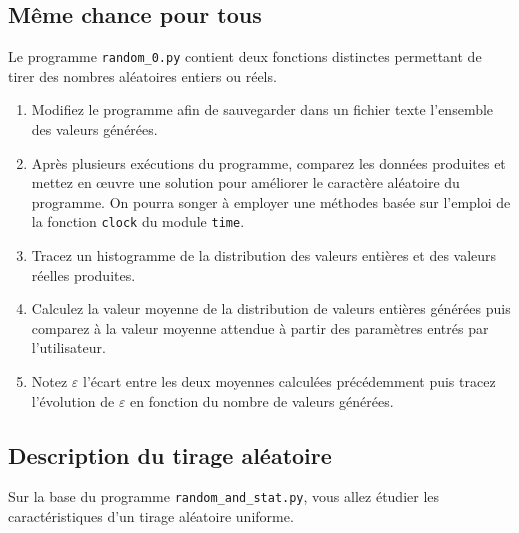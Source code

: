 \subsection{Même chance pour tous}

Le programme \texttt{random\_0.py}  contient deux fonctions distinctes
permettant de tirer des nombres aléatoires entiers ou réels.

\begin{enumerate}
\item Modifiez le programme afin  de sauvegarder dans un fichier texte
  l'ensemble des valeurs générées.

\item Après  plusieurs exécutions  du programme, comparez  les données
  produites  et mettez  en \oe{}uvre  une solution  pour améliorer  le
  caractère aléatoire du programme. On pourra songer à employer    une
  méthodes basée sur l'emploi  de la fonction \texttt{clock} du module
  \texttt{time}.

\item Tracez  un histogramme de la distribution des valeurs  entières et
  des valeurs réelles produites.

\item  Calculez  la  valeur  moyenne de  la  distribution  de  valeurs
  entières  générées puis  comparez  à la  valeur  moyenne attendue  à
  partir des paramètres entrés par l'utilisateur.

\item Notez  $\varepsilon$ l'écart  entre les deux  moyennes calculées
  précédemment puis tracez l'évolution de $\varepsilon$ en fonction du
  nombre de valeurs générées.

\end{enumerate}


\subsection{Description du tirage aléatoire}

Sur  la base  du programme  \texttt{random\_and\_stat.py}, vous  allez
étudier les caractéristiques d'un tirage aléatoire uniforme.


